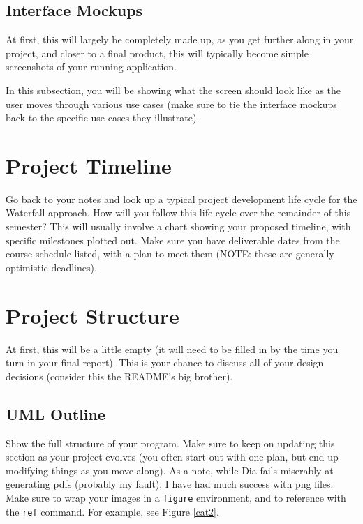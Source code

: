 \documentclass[10pt,conference,onecolumn,compsoc]{IEEEtran}
\begin{document}

\subsection{Interface Mockups}
At first, this will largely be completely made up, as you get further along in your project, and closer to a final product, this will typically become simple screenshots of your running application.

In this subsection, you will be showing what the screen should look like as the user moves through various use cases (make sure to tie the interface mockups back to the specific use cases they illustrate).



\section{Project Timeline}
Go back to your notes and look up a typical project development life cycle for the Waterfall approach.  How will you follow this life cycle over the remainder of this semester?  This will usually involve a chart showing your proposed timeline, with specific milestones plotted out.  Make sure you have deliverable dates from the course schedule listed, with a plan to meet them (NOTE: these are generally optimistic deadlines).

\section{Project Structure}
At first, this will be a little empty (it will need to be filled in by the time you turn in your final report).  This is your chance to discuss all of your design decisions (consider this the README's big brother).

\subsection{UML Outline}
Show the full structure of your program.  Make sure to keep on updating this section as your project evolves (you often start out with one plan, but end up modifying things as you move along).  As a note, while Dia fails miserably at generating pdfs (probably my fault), I have had much success with png files.  Make sure to wrap your images in a \texttt{figure} environment, and to reference with the \texttt{ref} command.  For example, see Figure \ref{cat2}.
\end{document}
